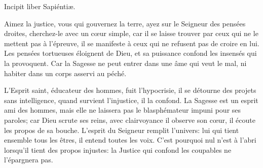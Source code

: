 \documentclass[RG2023_CarnetSpecial.tex]{subfiles}
\begin{document}






Incipit liber Sapiéntiæ.

Aimez la justice, vous qui gouvernez la terre,
	ayez sur le Seigneur des pensées droites, cherchez-le avec un cœur simple,
	car il se laisse trouver par ceux qui ne le mettent pas à l’épreuve,
	il se manifeste à ceux qui ne refusent pas de croire en lui.
Les pensées tortueuses éloignent de Dieu,
	et sa puissance confond les insensés qui la provoquent.
Car la Sagesse ne peut entrer dans une âme qui veut le mal,
	ni habiter dans un corps asservi au péché.


L’Esprit saint, éducateur des hommes, fuit l’hypocrisie,
	il se détourne des projets sans intelligence,
	quand survient l’injustice, il la confond.
La Sagesse est un esprit ami des hommes,
	mais elle ne laissera pas le blasphémateur impuni pour ses paroles;
	car Dieu scrute ses reins, avec clairvoyance il observe son cœur,
	il écoute les propos de sa bouche.
L’esprit du Seigneur remplit l’univers:
	lui qui tient ensemble tous les êtres, il entend toutes les voix.
C’est pourquoi nul n’est à l’abri lorsqu’il tient des propos injustes:
	la Justice qui confond les coupables ne l’épargnera pas.

\end{document}
